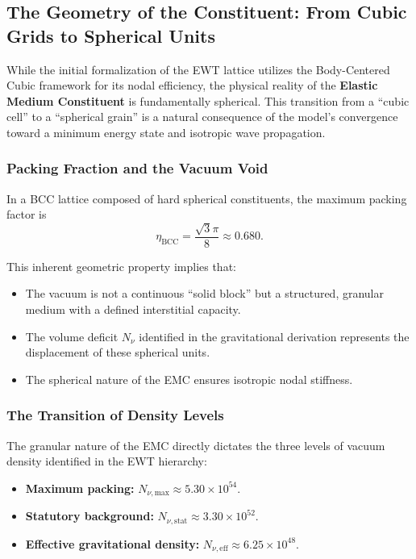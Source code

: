\documentclass[10pt,a4paper]{article}
\begin{document}
\subsection{The Geometry of the Constituent: From Cubic Grids to Spherical Units}
\label{sec:spherical_geometry}

While the initial formalization of the EWT lattice utilizes the Body-Centered Cubic framework for its nodal efficiency, the physical reality of the \textbf{Elastic Medium Constituent} is fundamentally spherical. This transition from a ``cubic cell'' to a ``spherical grain'' is a natural consequence of the model's convergence toward a minimum energy state and isotropic wave propagation.

\subsubsection*{Packing Fraction and the Vacuum Void}

In a BCC lattice composed of hard spherical constituents, the maximum packing factor is
\begin{equation}
	\eta_{\text{BCC}}
	=
	\frac{\sqrt{3}\pi}{8}
	\approx
	0.680.
\end{equation}

This inherent geometric property implies that:
\begin{itemize}
	\item The vacuum is not a continuous ``solid block'' but a structured, granular medium with a defined interstitial capacity.
	\item The volume deficit \(N_{\nu}\) identified in the gravitational derivation represents the displacement of these spherical units.
	\item The spherical nature of the EMC ensures isotropic nodal stiffness.
\end{itemize}

\subsubsection*{The Transition of Density Levels}

The granular nature of the EMC directly dictates the three levels of vacuum density identified in the EWT hierarchy:
\begin{itemize}
	\item \textbf{Maximum packing:}
	\(N_{\nu,\text{max}} \approx 5.30 \times 10^{54}\).
	\item \textbf{Statutory background:}
	\(N_{\nu,\text{stat}} \approx 3.30 \times 10^{52}\).
	\item \textbf{Effective gravitational density:}
	\(N_{\nu,\text{eff}} \approx 6.25 \times 10^{48}\).
\end{itemize}
\end{document}
